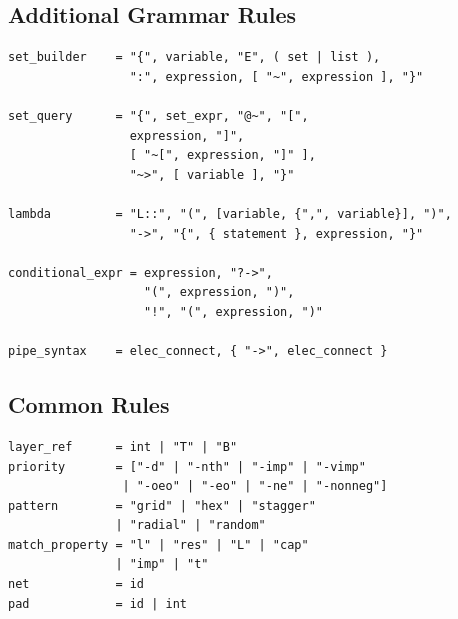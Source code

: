 \subsection{Additional Grammar Rules}
\begin{verbatim}
set_builder    = "{", variable, "E", ( set | list ),
                 ":", expression, [ "~", expression ], "}"

set_query      = "{", set_expr, "@~", "[",
                 expression, "]",
                 [ "~[", expression, "]" ],
                 "~>", [ variable ], "}"

lambda         = "L::", "(", [variable, {",", variable}], ")",
                 "->", "{", { statement }, expression, "}"

conditional_expr = expression, "?->",
                   "(", expression, ")",
                   "!", "(", expression, ")"

pipe_syntax    = elec_connect, { "->", elec_connect }
\end{verbatim}

\subsection{Common Rules}
\begin{verbatim}
layer_ref      = int | "T" | "B"
priority       = ["-d" | "-nth" | "-imp" | "-vimp"
                | "-oeo" | "-eo" | "-ne" | "-nonneg"]
pattern        = "grid" | "hex" | "stagger"
               | "radial" | "random"
match_property = "l" | "res" | "L" | "cap"
               | "imp" | "t"
net            = id
pad            = id | int
\end{verbatim}


